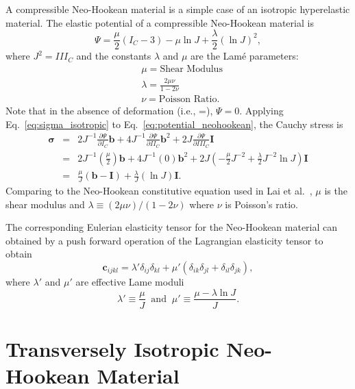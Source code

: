 A compressible Neo-Hookean material is a simple case of an isotropic hyperelastic material. The elastic potential of a compressible Neo-Hookean material is
%
\begin{equation}
\Psi = \frac{\mu}{2} (I_C-3) - \mu \ln J + \frac{\lambda}{2}(\ln J)^2,
\label{eq:potential_neohookean}
\end{equation}
%
where $J^2 = III_C$ and the constants $\lambda$ and $\mu$ are the Lam\'e parameters:
%
\begin{align}
&\mu = \text{Shear Modulus} \nonumber\\
&\lambda = \frac{2 \mu \nu}{1- 2 \nu} \nonumber\\
&\nu = \text{Poisson Ratio}.
\label{eq:lame_parameters}
\end{align}
%
Note that in the absence of deformation (i.e., =), $\Psi=0$. Applying Eq.\ \eqref{eq:sigma_isotropic} to Eq.\ \eqref{eq:potential_neohookean}, the Cauchy stress is
%
\begin{eqnarray}
\pmb{\sigma} &=&  2J^{-1}\frac{\partial \Psi}{\partial I_C} \pmb{b} + 4J^{-1} \frac{\partial \Psi}{\partial II_C} \pmb{b}^2 + 2J\frac{\partial \Psi}{\partial III_C} \pmb{I} \nonumber\\
%
&=& 2J^{-1} \left(\frac{\mu}{2}\right)\pmb{b} + 4J^{-1} (0) \pmb{b}^2 + 2J\left(-\frac{\mu}{2}J^{-2}+\frac{\lambda}{2} J^{-2} \ln J \right)\pmb{I}  \nonumber\\
%
&=& \frac{\mu}{J}(\pmb{b} - \pmb{I}) + \frac{\lambda}{J}(\ln J) \pmb{I}.
\label{eq:NeoHookean_stress}
\end{eqnarray}
%
Comparing to the Neo-Hookean constitutive equation used in Lai et al.\ \cite{Lai:2013fp}, $\mu$ is the shear modulus and $\lambda \equiv (2\mu \nu)/(1-2\nu)$ where $\nu$ is Poisson's ratio.

The corresponding Eulerian elasticity tensor for the Neo-Hookean material can obtained by a push forward operation of the Lagrangian elasticity tensor to obtain \cite{JavierBonet:2008uxa}
%
\begin{equation}
\pmb{c}_{ijkl} = \lambda'\delta_{ij}\delta_{kl} + \mu' (\delta_{ik}\delta_{jl} + \delta_{il}\delta_{jk}),
\end{equation}
%
where $\lambda'$ and $\mu'$ are effective Lame moduli
%
\begin{equation}
\lambda' \equiv \frac{\mu}{J} \ \text{ and } \ \mu' \equiv \frac{\mu-\lambda \ln J}{J}.
\end{equation}
%

\section{Transversely Isotropic Neo-Hookean Material}

